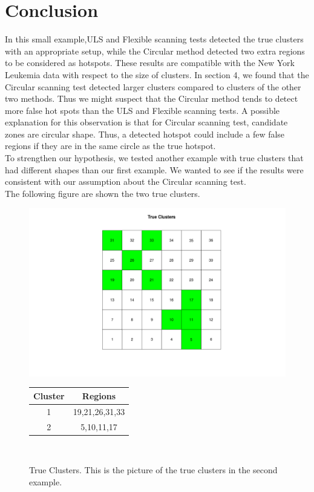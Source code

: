 \documentclass[12pt]{article}
\begin{document}
\section{Conclusion}

In this small example,ULS and Flexible scanning tests detected the true clusters with an appropriate setup, while the Circular method detected two extra regions to be considered as hotspots. These results are compatible with the New York Leukemia data with respect to the size of clusters. In section 4, we found that the Circular scanning test detected larger clusters compared to clusters of the other two methods. Thus we might suspect that the Circular method tends to detect more false hot spots than the ULS and Flexible scanning tests. A possible explanation for this observation is that for Circular scanning test, candidate zones are circular shape. Thus, a detected hotspot could include a few false regions if they are in the same circle as the true hotspot.\\  

To strengthen our hypothesis, we tested another example with true clusters that had different shapes than our first example. We wanted to see if the results were consistent with our assumption about the Circular scanning test.\\ 
The following figure are shown the two true clusters.\\

\begin{figure}[!ht]
	\centering
	\includegraphics[scale=0.2]{Ex2_True}\\
	
	\begin{tabular}{|c|c|}
		\hline
		Cluster & Regions \\
		\hline
		1 & 19,21,26,31,33 \\
		2 & 5,10,11,17 \\ \hline
	\end{tabular} \\
	
	
	\caption{True Clusters. This is the picture of the true clusters in the second example. \label{f:gull}}
	
\end{figure}
\end{document}
